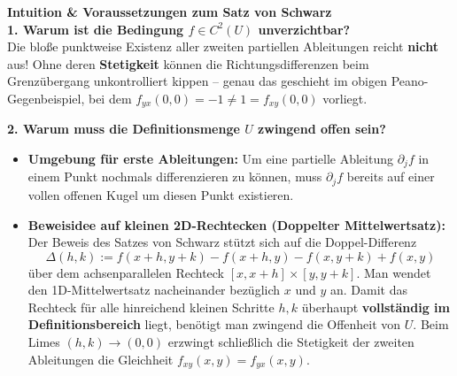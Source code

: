 \begin{remark}
    \textbf{Intuition \& Voraussetzungen zum Satz von Schwarz} \\
    \textbf{1. Warum ist die Bedingung $f \in C^2(U)$ unverzichtbar?} \\
    Die bloße punktweise Existenz aller zweiten partiellen Ableitungen reicht \textbf{nicht} aus! Ohne deren \textbf{Stetigkeit} können die Richtungsdifferenzen beim Grenzübergang unkontrolliert kippen – genau das geschieht im obigen Peano-Gegenbeispiel, bei dem $f_{yx}(0,0) = -1 \neq 1 = f_{xy}(0,0)$ vorliegt.

    \textbf{2. Warum muss die Definitionsmenge $U$ zwingend offen sein?}
    \begin{itemize}
        \item \textbf{Umgebung für erste Ableitungen:} Um eine partielle Ableitung $\partial_j f$ in einem Punkt nochmals differenzieren zu können, muss $\partial_j f$ bereits auf einer vollen offenen Kugel um diesen Punkt existieren.
        \item \textbf{Beweisidee auf kleinen 2D-Rechtecken (Doppelter Mittelwertsatz):} Der Beweis des Satzes von Schwarz stützt sich auf die Doppel-Differenz
        $$ \Delta(h, k) := f(x+h, y+k) - f(x+h, y) - f(x, y+k) + f(x, y) $$
        über dem achsenparallelen Rechteck $[x, x+h] \times [y, y+k]$. Man wendet den 1D-Mittelwertsatz nacheinander bezüglich $x$ und $y$ an. Damit das Rechteck für alle hinreichend kleinen Schritte $h, k$ überhaupt \textbf{vollständig im Definitionsbereich} liegt, benötigt man zwingend die Offenheit von $U$. Beim Limes $(h, k) \to (0, 0)$ erzwingt schließlich die Stetigkeit der zweiten Ableitungen die Gleichheit $f_{xy}(x, y) = f_{yx}(x, y)$.
    \end{itemize}
\end{remark}
